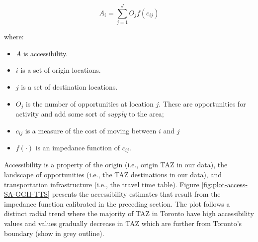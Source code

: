 \documentclass[Royal,times,sageh]{sagej}
\providecommand{\tightlist}{%
  \setlength{\itemsep}{0pt}\setlength{\parskip}{0pt}}
\begin{document}
\begin{equation}
\label{eq:conventional-accessibility}
A_i = \sum_{j=1}^JO_jf(c_{ij})
\end{equation}

\noindent where:

\begin{itemize}
\tightlist
\item
  \(A\) is accessibility.
\item
  \(i\) is a set of origin locations.
\item
  \(j\) is a set of destination locations.
\item
  \(O_j\) is the number of opportunities at location \(j\). These are
  opportunities for activity and add some sort of \emph{supply} to the
  area;
\item
  \(c_{ij}\) is a measure of the cost of moving between \(i\) and \(j\)
\item
  \(f(\cdot)\) is an impedance function of \(c_{ij}\).
\end{itemize}

Accessibility is a property of the origin (i.e., origin TAZ in our
data), the landscape of opportunities (i.e., the TAZ destinations in our
data), and transportation infrastructure (i.e., the travel time table).
Figure \ref{fig:plot-access-SA-GGH-TTS} presents the accessibility
estimates that result from the impedance function calibrated in the
preceding section. The plot follows a distinct radial trend where the
majority of TAZ in Toronto have high accessibility values and values
gradually decrease in TAZ which are further from Toronto's boundary
(show in grey outline).
\end{document}
